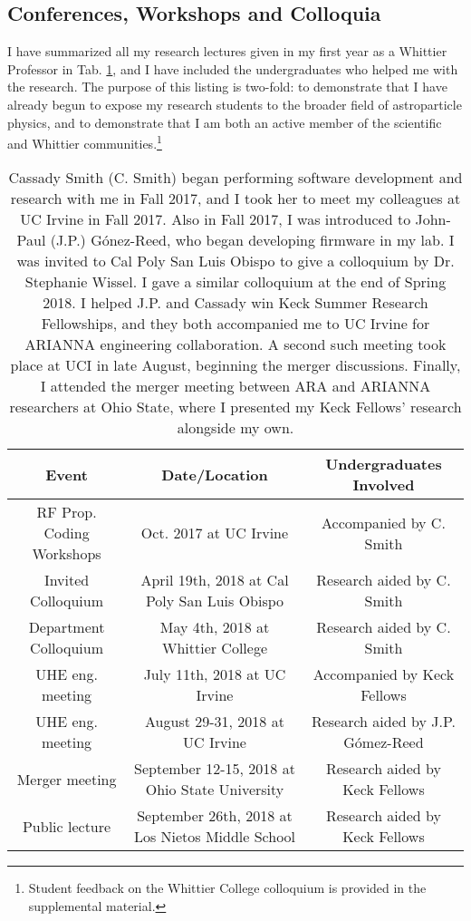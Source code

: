 \documentclass[../../main.tex]{subfiles}
\begin{document}
\subsection{Conferences, Workshops and Colloquia}

I have summarized all my research lectures given in my first year as a Whittier Professor in Tab. \ref{tab:conf}, and I have included the undergraduates who helped me with the research.  The purpose of this listing is two-fold: to demonstrate that I have already begun to expose my research students to the broader field of astroparticle physics, and to demonstrate that I am both an active member of the scientific and Whittier communities.\footnote{Student feedback on the Whittier College colloquium is provided in the supplemental material.}

\begin{table}[hb]
\small
\centering
\begin{tabular}{|c|c|c|}
\hline \hline
Event & Date/Location & Undergraduates Involved \\ \hline
RF Prop. Coding Workshops & Oct. 2017 at UC Irvine & Accompanied by C. Smith \\ \hline
Invited Colloquium & April 19th, 2018 at Cal Poly San Luis Obispo & Research aided by C. Smith \\ \hline
Department Colloquium & May 4th, 2018 at Whittier College & Research aided by C. Smith \\ \hline
UHE eng. meeting & July 11th, 2018 at UC Irvine & Accompanied by Keck Fellows \\ \hline
UHE eng. meeting & August 29-31, 2018 at UC Irvine & Research aided by J.P. G\'{o}mez-Reed \\ \hline
Merger meeting & September 12-15, 2018 at Ohio State University & Research aided by Keck Fellows \\ \hline
Public lecture & September 26th, 2018 at Los Nietos Middle School & Research aided by Keck Fellows \\ \hline
\hline
\end{tabular}
\caption{\label{tab:conf} Cassady Smith (C. Smith) began performing software development and research with me in Fall 2017, and I took her to meet my colleagues at UC Irvine in Fall 2017. Also in Fall 2017, I was introduced to John-Paul (J.P.) G\'{o}nez-Reed, who began developing firmware in my lab.  I was invited to Cal Poly San Luis Obispo to give a colloquium by Dr. Stephanie Wissel.  I gave a similar colloquium at the end of Spring 2018.  I helped J.P. and Cassady win Keck Summer Research Fellowships, and they both accompanied me to UC Irvine for ARIANNA engineering collaboration.  A second such meeting took place at UCI in late August, beginning the merger discussions.  Finally, I attended the merger meeting between ARA and ARIANNA researchers at Ohio State, where I presented my Keck Fellows' research alongside my own.}
\end{table}
\end{document}
